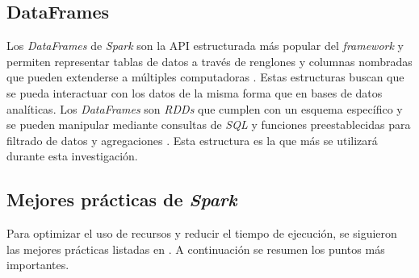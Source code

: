 \subsection{DataFrames}

Los \textit{DataFrames} de \textit{Spark} son la API estructurada más popular del \textit{framework} y permiten representar tablas de datos a través de renglones y columnas nombradas que pueden extenderse a múltiples computadoras \cite{sparkguide}. Estas estructuras buscan que se pueda interactuar con los datos de la misma forma que en bases de datos analíticas. Los \textit{DataFrames} son \textit{RDDs} que cumplen con un esquema específico \cite{sparkberkeley} y se pueden manipular mediante consultas de \textit{SQL} y funciones preestablecidas para filtrado de datos y agregaciones \cite{sparkberkeley}. Esta estructura es la que más se utilizará durante esta investigación.

\subsection{Mejores prácticas de \textit{Spark}}

Para optimizar el uso de recursos y reducir el tiempo de ejecución, se siguieron las mejores prácticas listadas en \cite{sparkibm}. A continuación se resumen los puntos más importantes.

